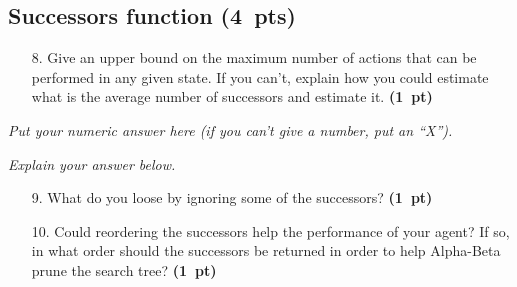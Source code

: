 \documentclass[11pt,a4paper]{report}
\begin{document}
\begin{answers}[20cm]
\end{answers}






\clearpage
\subsection{Successors function (4~pts)}

\begin{enumerate}
\item[8.] Give an upper bound on the maximum number of actions that can be performed in
any given state. If you can't, explain how you could estimate what is the average
number of successors and estimate it. \textbf{(1~pt)}
\end{enumerate}

\quad \textit{Put your numeric answer here (if you can't give a number, put an ``X'').}

\begin{smallanswers}
\end{smallanswers}

\quad \textit{Explain your answer below.}

\begin{answers}[8cm]
\end{answers}






\begin{enumerate}
\item[9.] What do you loose by ignoring some of the successors? \textbf{(1~pt)}
\end{enumerate}

\begin{answers}[8cm]
\end{answers}






\begin{enumerate}
\item[10.] Could reordering the successors help the performance of your agent? If so, in what order should the successors be returned in order to help Alpha-Beta
prune the search tree? \textbf{(1~pt)}
\end{enumerate}

\begin{answers}[9cm]
\end{answers}
\end{document}
